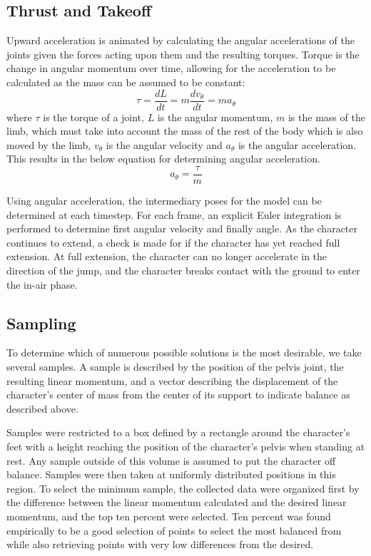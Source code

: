 \subsection{Thrust and Takeoff}
Upward acceleration is animated by calculating the angular accelerations of the joints given the forces acting upon them and the resulting torques.  Torque is the change in angular momentum over time, allowing for the acceleration to be calculated as the mass can be assumed to be constant: \[\tau = \dfrac{dL}{dt} = m \dfrac{dv_{\theta}}{dt} = m a_{\theta}\] where $\tau$ is the torque of a joint, $L$ is the angular momentum, $m$ is the mass of the limb, which must take into account the mass of the rest of the body which is also moved by the limb, $v_{\theta}$ is the angular velocity and $a_{\theta}$ is the angular acceleration. This results in the below equation for determining angular acceleration. \[a_{\theta} = \dfrac{\tau}{m}\]

Using angular acceleration, the intermediary poses for the model can be determined at each timestep.   For each frame, an explicit Euler integration is performed to determine first angular velocity and finally angle.  As the character continues to extend, a check is made for if the character has yet reached full extension.  At full extension, the character can no longer accelerate in the direction of the jump, and the character breaks contact with the ground to enter the in-air phase.

\subsection{Sampling}
To determine which of numerous possible solutions is the most desirable, we take several samples.  A sample is described by the position of the pelvis joint, the resulting linear momentum, and a vector describing the displacement of the character's center of mass from the center of its support to indicate balance as described above.

Samples were restricted to a box defined by a rectangle around the character's feet with a height reaching the position of the character's pelvis when standing at rest.  Any sample outside of this volume is assumed to put the character off balance.  Samples were then taken at uniformly distributed positions in this region.  To select the minimum sample, the collected data were organized first by the difference between the linear momentum calculated and the desired linear momentum, and the top ten percent were selected.  Ten percent was found empirically to be a good selection of points to select the most balanced from while also retrieving points with very low differences from the desired.

